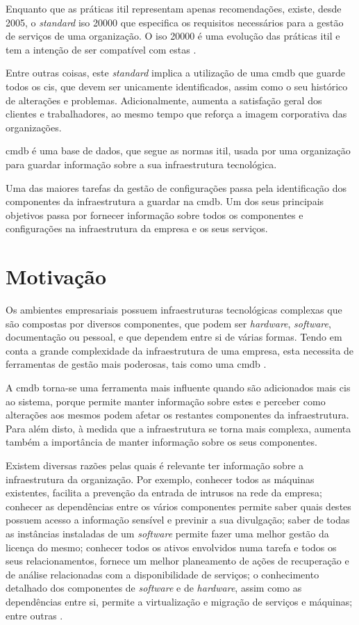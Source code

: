 \documentclass[
  oneside,
  11pt, a4paper,
  footinclude=true,
  headinclude=true,
  cleardoublepage=empty
]{scrbook}
\begin{document}
Enquanto que as práticas \gls{itil} representam apenas recomendações, existe, desde 2005, o \textit{standard} \gls{iso} 20000 \cite{iso20000} que especifica os requisitos necessários para a gestão de serviços de uma organização. O \gls{iso} 20000 é uma evolução das práticas \gls{itil} e tem a intenção de ser compatível com estas \cite{cmdb5steps}. 

Entre outras coisas, este \textit{standard} implica a utilização de uma \gls{cmdb} que guarde todos os \glspl{ci}, que devem ser unicamente identificados, assim como o seu histórico de alterações e problemas. Adicionalmente, aumenta a satisfação geral dos clientes e trabalhadores, ao mesmo tempo que reforça a imagem corporativa das organizações.

\gls{cmdb} é uma base de dados, que segue as normas \gls{itil}, usada por uma organização para guardar informação sobre a sua infraestrutura tecnológica.

Uma das maiores tarefas da gestão de configurações passa pela identificação dos componentes da infraestrutura a guardar na \gls{cmdb}. Um dos seus principais objetivos passa por fornecer informação sobre todos os componentes e configurações na infraestrutura da empresa e os seus serviços. 
	
	\section{Motivação}
	
Os ambientes empresariais possuem infraestruturas tecnológicas complexas que são compostas por diversos componentes, que podem ser \textit{hardware}, \textit{software}, documentação ou pessoal, e que dependem entre si de várias formas. Tendo em conta a grande complexidade da infraestrutura de uma empresa, esta necessita de ferramentas de gestão mais poderosas, tais como uma \gls{cmdb} \cite{taddm}. 

A \gls{cmdb} torna-se uma ferramenta mais influente quando são adicionados mais \glspl{ci} ao sistema, porque permite manter informação sobre estes e perceber como alterações aos mesmos podem afetar os restantes componentes da infraestrutura. Para além disto, à medida que a infraestrutura se torna mais complexa, aumenta também a importância de manter informação sobre os seus componentes.

Existem diversas razões pelas quais é relevante ter informação sobre a infraestrutura da organização. Por exemplo, conhecer todos as máquinas existentes, facilita a prevenção da entrada de intrusos na rede da empresa; conhecer as dependências entre os vários componentes permite saber quais destes possuem acesso a informação sensível e previnir a sua divulgação; saber de todas as instâncias instaladas de um \textit{software} permite fazer uma melhor gestão da licença do mesmo; conhecer todos os ativos envolvidos numa tarefa e todos os seus relacionamentos, fornece um melhor planeamento de ações de recuperação e de análise relacionadas com a disponibilidade de serviços; o conhecimento detalhado dos componentes de \textit{software} e de \textit{hardware}, assim como as dependências entre si, permite a virtualização e migração de serviços e máquinas; entre outras \cite{taddm}.
\end{document}
